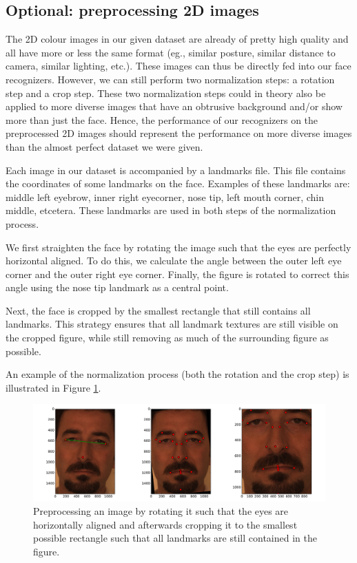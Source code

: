 \documentclass[]{article}
\begin{document}
\subsection{Optional: preprocessing 2D images}
The 2D colour images in our given dataset are already of pretty high quality and all have more or less the same format (eg., similar posture, similar distance to camera, similar lighting, etc.). These images can thus be directly fed into our face recognizers. However, we can still perform two normalization steps: a rotation step and a crop step. These two normalization steps could in theory also be applied to more diverse images that have an obtrusive background and/or show more than just the face. Hence, the performance of our recognizers on the preprocessed 2D images should represent the performance on more diverse images than the almost perfect dataset we were given.

Each image in our dataset is accompanied by a landmarks file. This file contains the coordinates of some landmarks on the face. Examples of these landmarks are: middle left eyebrow, inner right eyecorner, nose tip, left mouth corner, chin middle, etcetera. These landmarks are used in both steps of the normalization process.

We first straighten the face by rotating the image such that the eyes are perfectly horizontal aligned. To do this, we calculate the angle between the outer left eye corner and the outer right eye corner. Finally, the figure is rotated to correct this angle using the nose tip landmark as a central point.

Next, the face is cropped by the smallest rectangle that still contains all landmarks. This strategy ensures that all landmark textures are still visible on the cropped figure, while still removing as much of the surrounding figure as possible.

An example of the normalization process (both the rotation and the crop step) is illustrated in Figure \ref{fig:preprocess}.

\begin{figure}
	\centering
	\includegraphics[width=\textwidth]{preprocess2D.pdf}
	\caption{Preprocessing an image by rotating it such that the eyes are horizontally aligned and afterwards cropping it to the smallest possible rectangle such that all landmarks are still contained in the figure.}
	\label{fig:preprocess}
\end{figure}
\end{document}
